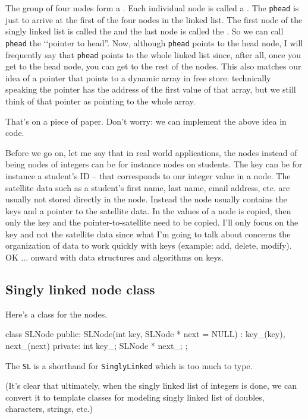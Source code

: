 The group of four nodes form a .
Each individual node is called a .
The \verb!phead! is just to arrive at the first of the four nodes
in the linked list.
The first node of the singly linked list is called the
and the last node is called the
\sidebarskip{8pt}
.
\sidebarskip{-8pt}
So we can call \verb!phead! the \lq\lq pointer to head''.
Now, although \verb!phead! points to the head node,
I will frequently say that \verb!phead! points to the whole linked list
since, after all, once you get to the head node, you can get to the
rest of the nodes.
This also matches our idea of a pointer that points to
a dynamic array in free store: technically speaking
the pointer has the address of the first value of that array, but
we still think of that pointer as pointing to the whole array.

That's on a piece of paper.
Don't worry: we can implement the above idea in code.

Before we go on, let me say that in real world applications,
the nodes instead of being nodes of integers can be
for instance nodes on students.
The key can be for instance a student's ID -- that corresponds
to our integer value in a node.
The satellite data such as a student's first name,
last name, email address, etc. are usually not stored
directly in the node.
Instead the node usually contains the keys and
a pointer to the satellite data.
In the values of a node is copied, then only the key and
the pointer-to-satellite need to be copied.
I'll only focus on the key and not the satellite data
since what I'm going to talk about
concerns the organization of data to work quickly with keys
(example: add, delete, modify).
OK ... onward with data structures and algorithms on keys.



\newpage
\subsection{Singly linked node class}
Here's a class for the nodes.
\begin{console}[fontsize=\footnotesize]
class SLNode
{
public:
    SLNode(int key, SLNode * next = NULL)
      : key_(key), next_(next)
    {}
private:
    int key_;
    SLNode * next_;
};
\end{console}
The \verb!SL! is a shorthand for \verb!SinglyLinked! which is too much to
type.

(It's clear that ultimately, when the singly linked list of
integers is done, we can
convert it to template classes for modeling
singly linked list of doubles, characters, strings, etc.)

